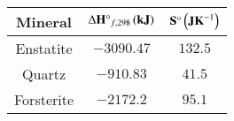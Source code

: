 \begin{tabular}{|c|c|c|}
     \hline
     \textbf{Mineral} & $\Delta\textbf{H}\degree_{f,298}\left(\textbf{kJ}\right)$ & $\textbf{S}\degree\left(\textbf{JK}^{-1}\right)$ \\  
     \hline
     Enstatite & $-3090.47$ & $132.5$ \\
     \hline
     Quartz & $-910.83$&$41.5$\\
     \hline
     Forsterite & $-2172.2$ & $95.1$ \\
     \hline
\end{tabular}